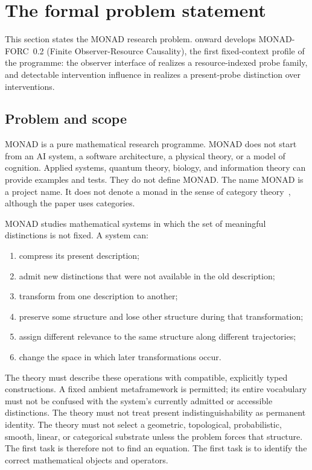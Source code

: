 \section{The formal problem statement}\label{sec:problem-statement}

This section states the MONAD research problem.
 onward develops MONAD-FORC~0.2 (Finite
Observer-Resource Causality), the first fixed-context profile of the
programme: the observer interface of  realizes a
resource-indexed probe family, and detectable intervention influence
in  realizes a present-probe
distinction over interventions.

\subsection{Problem and scope}

MONAD is a pure mathematical research programme. MONAD does not start
from an AI system, a software architecture, a physical theory, or a
model of cognition. Applied systems, quantum theory, biology, and
information theory can provide examples and tests. They do not define
MONAD\@. The name MONAD is a project name. It does not denote a monad
in the sense of category theory~\cite{maclane1998categories}, although
the paper uses categories.

MONAD studies mathematical systems in which the set of meaningful
distinctions is not fixed. A system can:
\begin{enumerate}
  \item compress its present description;
  \item admit new distinctions that were not available in the old
    description;
  \item transform from one description to another;
  \item preserve some structure and lose other structure during that
    transformation;
  \item assign different relevance to the same structure along
    different trajectories;
  \item change the space in which later transformations occur.
\end{enumerate}

The theory must describe these operations with compatible, explicitly typed
constructions. A fixed ambient metaframework is permitted; its entire
vocabulary must not be confused with the system's currently admitted or
accessible distinctions. The theory must
not treat present indistinguishability as permanent identity. The
theory must not select a geometric, topological, probabilistic,
smooth, linear, or categorical substrate unless the problem forces
that structure. The first task is therefore not to find an equation.
The first task is to identify the correct mathematical objects and
operators.

